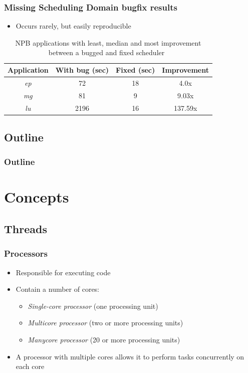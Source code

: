 \documentclass{beamer}
\newcommand{\linespace}{\vskip 0.25cm}
\begin{document}
\begin{frame}
\frametitle{Missing Scheduling Domain bugfix results}
\begin{itemize}
	\item Occurs rarely, but easily reproducible
\end{itemize}

\begin{table}
	\centering
	\begin{tabular}{| c | c | c | c |}
		\hline			
	  	\textbf{Application} & \textbf{With bug (sec)} & \textbf{Fixed (sec)} & \textbf{Improvement} \\ \hline
		\emph{ep} & 72 & 18 & 4.0x \\ \hline
		\emph{mg} & 81 & 9 & 9.03x \\ \hline
		\emph{lu} & 2196 & 16 & 137.59x \\ \hline	
	\end{tabular}
	\caption{NPB applications with least, median and most improvement between a bugged and fixed scheduler~\cite{Lozi:2016}}
\end{table}
\end{frame}

\subsection*{Outline}

\begin{frame}
  \frametitle{Outline}
  \tableofcontents[hideallsubsections]
\end{frame}

\section[Concepts]{Concepts}

\subsection[Threads]{Threads}

\begin{frame}
\frametitle{Processors}
	\begin{itemize}
	\item Responsible for executing code
	\linespace
	\item Contain a number of cores:	
	\begin{itemize}
		\item \emph{Single-core processor} (one processing unit) 
		\item \emph{Multicore processor} (two or more processing units)
		\item \emph{Manycore processor} (20 or more processing units)
	\end{itemize}
	\linespace
	\item A processor with multiple cores allows it to perform tasks concurrently on each core
	\end{itemize}
\end{frame}
\end{document}
